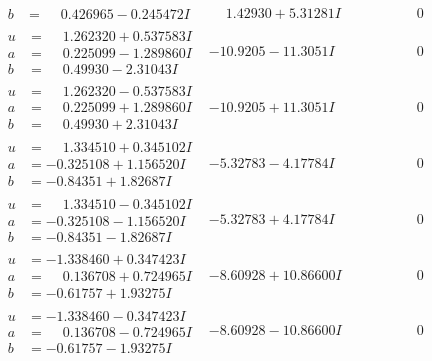 \documentclass[1p]{elsarticle_modified}
\theoremstyle{definition}
\begin{document}
$$\begin{array}{c|c|c}
\begin{aligned}
b &= \phantom{-}0.426965 - 0.245472 I\end{aligned}
 & \phantom{-}1.42930 + 5.31281 I & \phantom{-0.000000 } 0 \\ \hline\begin{aligned}
u &= \phantom{-}1.262320 + 0.537583 I \\
a &= \phantom{-}0.225099 - 1.289860 I \\
b &= \phantom{-}0.49930 - 2.31043 I\end{aligned}
 & -10.9205 - 11.3051 I & \phantom{-0.000000 } 0 \\ \hline\begin{aligned}
u &= \phantom{-}1.262320 - 0.537583 I \\
a &= \phantom{-}0.225099 + 1.289860 I \\
b &= \phantom{-}0.49930 + 2.31043 I\end{aligned}
 & -10.9205 + 11.3051 I & \phantom{-0.000000 } 0 \\ \hline\begin{aligned}
u &= \phantom{-}1.334510 + 0.345102 I \\
a &= -0.325108 + 1.156520 I \\
b &= -0.84351 + 1.82687 I\end{aligned}
 & -5.32783 - 4.17784 I & \phantom{-0.000000 } 0 \\ \hline\begin{aligned}
u &= \phantom{-}1.334510 - 0.345102 I \\
a &= -0.325108 - 1.156520 I \\
b &= -0.84351 - 1.82687 I\end{aligned}
 & -5.32783 + 4.17784 I & \phantom{-0.000000 } 0 \\ \hline\begin{aligned}
u &= -1.338460 + 0.347423 I \\
a &= \phantom{-}0.136708 + 0.724965 I \\
b &= -0.61757 + 1.93275 I\end{aligned}
 & -8.60928 + 10.86600 I & \phantom{-0.000000 } 0 \\ \hline\begin{aligned}
u &= -1.338460 - 0.347423 I \\
a &= \phantom{-}0.136708 - 0.724965 I \\
b &= -0.61757 - 1.93275 I\end{aligned}
 & -8.60928 - 10.86600 I & \phantom{-0.000000 } 0 \\ \hline\begin{aligned}

\end{aligned}
\end{array}$$
\end{document}
